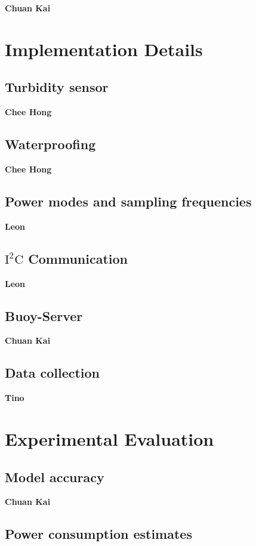 \documentclass{article}
\begin{document}
\textbf{Chuan Kai}

\section{Implementation Details}

\subsection{Turbidity sensor}

\textbf{Chee Hong}

\subsection{Waterproofing}

\textbf{Chee Hong}

\subsection{Power modes and sampling frequencies}

\textbf{Leon}

\subsection{$\text{I}^2\text{C}$ Communication}

\textbf{Leon}

\subsection{Buoy-Server}

\textbf{Chuan Kai}

\subsection{Data collection}

\textbf{Tino}

\section{Experimental Evaluation}

\subsection{Model accuracy}

\textbf{Chuan Kai}

\subsection{Power consumption estimates}
\end{document}
